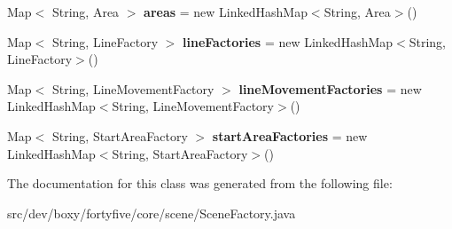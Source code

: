 \begin{DoxyCompactItemize}
\item 
\hypertarget{classdev_1_1boxy_1_1fortyfive_1_1core_1_1scene_1_1_scene_factory_a4d889f4f7bdf3bea1aae6ee7b8ca9e3a}{
Map$<$ String, Area $>$ {\bfseries areas} = new LinkedHashMap$<$String, Area$>$()}
\label{d4/d69/classdev_1_1boxy_1_1fortyfive_1_1core_1_1scene_1_1_scene_factory_a4d889f4f7bdf3bea1aae6ee7b8ca9e3a}

\item 
\hypertarget{classdev_1_1boxy_1_1fortyfive_1_1core_1_1scene_1_1_scene_factory_a780f6aeb2383ae6d16c776a5f0690046}{
Map$<$ String, LineFactory $>$ {\bfseries lineFactories} = new LinkedHashMap$<$String, LineFactory$>$()}
\label{d4/d69/classdev_1_1boxy_1_1fortyfive_1_1core_1_1scene_1_1_scene_factory_a780f6aeb2383ae6d16c776a5f0690046}

\item 
\hypertarget{classdev_1_1boxy_1_1fortyfive_1_1core_1_1scene_1_1_scene_factory_a233cfd33e956d07eb94e4bf9523a9bd4}{
Map$<$ String, LineMovementFactory $>$ {\bfseries lineMovementFactories} = new LinkedHashMap$<$String, LineMovementFactory$>$()}
\label{d4/d69/classdev_1_1boxy_1_1fortyfive_1_1core_1_1scene_1_1_scene_factory_a233cfd33e956d07eb94e4bf9523a9bd4}

\item 
\hypertarget{classdev_1_1boxy_1_1fortyfive_1_1core_1_1scene_1_1_scene_factory_aa6c39113c6b98f9205ef2a4fcb4815be}{
Map$<$ String, StartAreaFactory $>$ {\bfseries startAreaFactories} = new LinkedHashMap$<$String, StartAreaFactory$>$()}
\label{d4/d69/classdev_1_1boxy_1_1fortyfive_1_1core_1_1scene_1_1_scene_factory_aa6c39113c6b98f9205ef2a4fcb4815be}

\end{DoxyCompactItemize}


The documentation for this class was generated from the following file:\begin{DoxyCompactItemize}
\item 
src/dev/boxy/fortyfive/core/scene/SceneFactory.java\end{DoxyCompactItemize}

